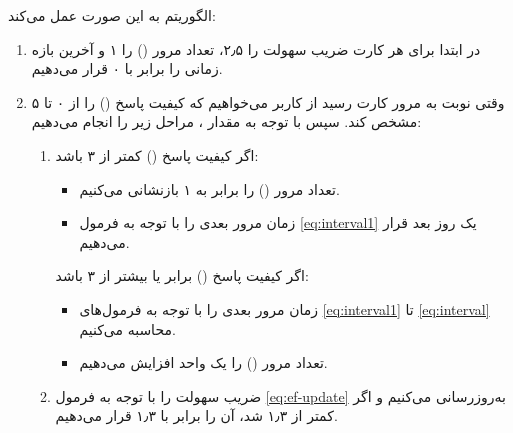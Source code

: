\documentclass[12pt]{report}
\begin{document}
الگوریتم به این صورت عمل می‌کند:
\begin{enumerate}
    \item در ابتدا برای هر کارت ضریب سهولت را ۲٫۵، تعداد مرور
    () را ۱ و آخرین بازه زمانی را برابر با ۰ قرار می‌دهیم.
    \item وقتی نوبت به مرور کارت رسید از کاربر می‌خواهیم که کیفیت پاسخ
    () را از ۰ تا ۵ مشخص کند. سپس با توجه به مقدار ، مراحل زیر را انجام می‌دهیم:
    \begin{enumerate}
        \item اگر کیفیت پاسخ
        () کمتر از ۳ باشد:
        \begin{itemize}
            \item تعداد مرور
            () را برابر به ۱ بازنشانی می‌کنیم.
            \item زمان مرور بعدی را
             با توجه به فرمول \ref{eq:interval1}
            یک روز بعد قرار می‌دهیم.
        \end{itemize}
        اگر کیفیت پاسخ
        () برابر یا بیشتر از ۳ باشد:
        \begin{itemize}
            \item زمان مرور بعدی را با توجه به فرمول‌های
            \ref{eq:interval1} تا \ref{eq:interval}
            محاسبه می‌کنیم.
            \item تعداد مرور
            () را یک واحد افزایش می‌دهیم.
        \end{itemize}
        \item ضریب سهولت را
        با توجه به فرمول \ref{eq:ef-update}
        به‌روزرسانی می‌کنیم و اگر کمتر از ۱٫۳ شد، آن را برابر با ۱٫۳ قرار می‌دهیم.
    \end{enumerate}
\end{enumerate}
\end{document}
